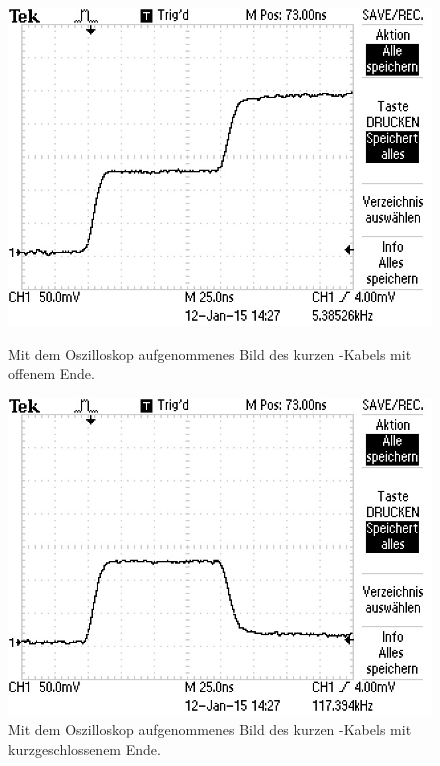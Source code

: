 \begin{figure}[ht]
  \centering
  \includegraphics[scale=1.0]{bilder/reflexion/F0002TEK.JPG}
  \caption{Mit dem Oszilloskop aufgenommenes Bild des kurzen \BU-Kabels mit
  offenem Ende.}
  \label{fig:oszi_75k_offen}
  \vspace{2em}
  \includegraphics[scale=1.0]{bilder/reflexion/F0003TEK.JPG}
  \caption{Mit dem Oszilloskop aufgenommenes Bild des kurzen \BU-Kabels mit
  kurzgeschlossenem Ende.}
  \label{fig:oszi_75k_kurz}
\end{figure}

